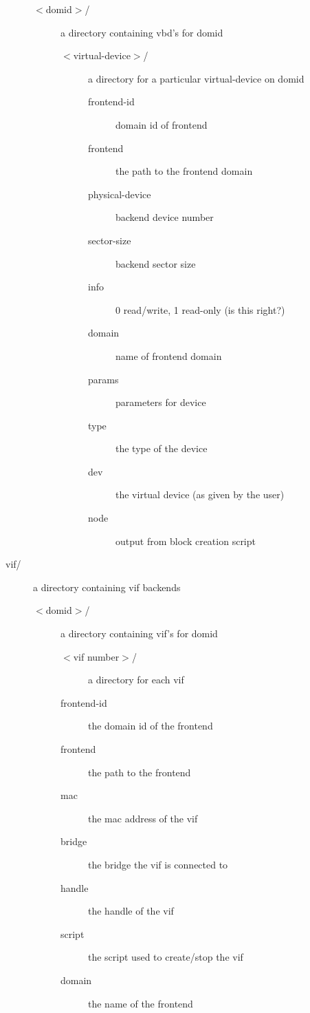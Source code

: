 \documentclass[11pt,twoside,final,openright,a4paper]{report}
\begin{document}
\begin{description}
\begin{description}
\begin{description}
    \item[$<$domid$>$/] a directory containing vbd's for domid
      \begin{description}
      \item[$<$virtual-device$>$/] a directory for a particular
	virtual-device on domid
	\begin{description}
	\item[frontend-id] domain id of frontend
	\item[frontend] the path to the frontend domain
	\item[physical-device] backend device number
	\item[sector-size] backend sector size
	\item[info] 0 read/write, 1 read-only (is this right?)
	\item[domain] name of frontend domain
	\item[params] parameters for device
	\item[type] the type of the device
	\item[dev] the virtual device (as given by the user)
	\item[node] output from block creation script
	\end{description}
      \end{description}
    \end{description}
  
  \item[vif/] a directory containing vif backends
    \begin{description}
    \item[$<$domid$>$/] a directory containing vif's for domid
      \begin{description}
      \item[$<$vif number$>$/] a directory for each vif
      \item[frontend-id] the domain id of the frontend
      \item[frontend] the path to the frontend
      \item[mac] the mac address of the vif
      \item[bridge] the bridge the vif is connected to
      \item[handle] the handle of the vif
      \item[script] the script used to create/stop the vif
      \item[domain] the name of the frontend
      \end{description}
    \end{description}


\end{description}
\end{description}
\end{document}
